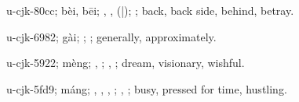 \begin{multicols}{2}
{\cjkgGlue{}u-cjk-80cc; bèi, bēi; \cjkgGlue{}, \cjkgGlue{}, \cjkgGlue{}\cjkgGlue{}(\cjkgGlue{}|\cjkgGlue{}); \cjkgGlue{}; back, back side, behind, betray.

\cjkgGlue{}u-cjk-6982; gài; \cjkgGlue{}\cjkgGlue{}\cjkgGlue{}; \cjkgGlue{}; generally, approximately.

\cjkgGlue{}u-cjk-5922; mèng; \cjkgGlue{}\cjkgGlue{}\cjkgGlue{}, \cjkgGlue{}\cjkgGlue{}\cjkgGlue{}; \cjkgGlue{}, \cjkgGlue{}; dream, visionary, wishful.

\cjkgGlue{}u-cjk-5fd9; máng; \cjkgGlue{}\cjkgGlue{}\cjkgGlue{}, \cjkgGlue{}\cjkgGlue{}\cjkgGlue{}, \cjkgGlue{}\cjkgGlue{}\cjkgGlue{}, \cjkgGlue{}; \cjkgGlue{}, \cjkgGlue{}; busy, pressed for time, hustling.

}
\end{multicols}
